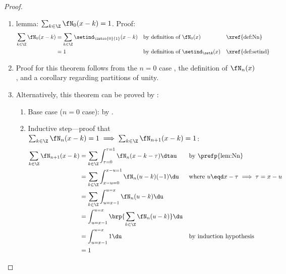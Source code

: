 \begin{proof}
    \begin{enumerate}
      \item lemma: $\sum_{k\in\Z}\fN_0(x-k)=1$. Proof: \label{ilem:bspline_punity_n0}\\
        \begin{align*}
          \sum_{k\in\Z}\fN_0(x-k)
            &= \sum_{k\in\Z} \setind_\intco{0}{1}(x-k)
            && \text{by definition of $\fN_0(x)$}
            && \text{\xref{def:Nn}}
          \\&= 1
            && \text{by definition of $\setind_\setA(x)$}
            && \text{\xref{def:setind}}
        \end{align*}

      \item Proof for this theorem follows from the $n=0$ case ,
            the definition of $\fN_n(x)$ , and a corollary regarding partitions of unity.

      \item Alternatively, this theorem can be proved by :
        \begin{enumerate}
          \item Base case ($n=0$ case): by .
          \item Inductive step---proof that $\sum_{k\in\Z}\fN_n(x-k)=1 \implies \sum_{k\in\Z}\fN_{n+1}(x-k)=1$:
            \begin{align*}
              \sum_{k\in\Z}\fN_{n+1}(x-k)
                &= \sum_{k\in\Z}\int_{\tau=0}^{\tau=1}\fN_{n}(x-k-\tau)\dtau
                && \text{by \prefp{lem:Nn}}
              \\&= \sum_{k\in\Z}\int_{x-u=0}^{x-u=1}\fN_{n}(u-k)(-1)\du
                && \text{where $u\eqd x-\tau \implies \tau=x-u$}
              \\&= \sum_{k\in\Z}\int_{u=x-1}^{u=x}\fN_{n}(u-k)\du
              \\&= \int_{u=x-1}^{u=x}\brp{\sum_{k\in\Z}\fN_{n}(u-k)}\du
              \\&= \int_{u=x-1}^{u=x}1\du
                && \text{by induction hypothesis}
              \\&= 1
            \end{align*}
        \end{enumerate}
    \end{enumerate}
\end{proof}

